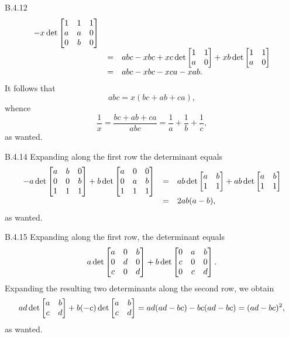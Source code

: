 \begin{Answer}{B.4.12}
$$\begin{array}{lll}
- x\det\begin{bmatrix} 1 & 1 & 1 \cr a & a & 0 \cr  0 & b & 0 \cr \end{bmatrix}\\
& = &   abc - xbc + xc\det \begin{bmatrix} 1 & 1 \cr  a & 0 \cr\end{bmatrix}  + xb\det \begin{bmatrix} 1 & 1 \cr  a & 0 \cr\end{bmatrix} \\
& = & abc - xbc - xca -xab.
     \end{array}$$It follows that $$abc = x(bc + ab + ca), $$whence$$\frac{1}{x} = \frac{bc + ab + ca}{abc} = \frac{1}{a} +\frac{1}{b} + \frac{1}{c},  $$as wanted.

\end{Answer}
\begin{Answer}{B.4.14}
 Expanding along the first row the determinant equals
$$\begin{array}{lll}-a\det\begin{bmatrix} a & b & 0 \cr
0 & 0 & b \cr 1 & 1 & 1 \cr \end{bmatrix} + b\det\begin{bmatrix} a
& 0 & 0 \cr 0 & a & b \cr 1 & 1 & 1 \cr\end{bmatrix}  & = &  ab
\det\begin{bmatrix} a & b \cr 1 & 1  \cr
\end{bmatrix} + ab\det\begin{bmatrix} a & b \cr 1 & 1  \cr
\end{bmatrix}  \\ & =  & 2ab (a - b), \end{array}$$as wanted.
\end{Answer}
\begin{Answer}{B.4.15}
 Expanding along the first row, the determinant equals
$$ a\det\begin{bmatrix} a & 0 & b \cr 0 & d & 0 \cr c & 0 & d \cr  \end{bmatrix}
+ b \det\begin{bmatrix} 0 & a & b \cr c & 0 & 0 \cr 0 & c & d \cr
\end{bmatrix}.
$$Expanding the resulting two determinants along the second row,
we obtain $$ad\det\begin{bmatrix}a & b \cr c & d\cr \end{bmatrix}
+ b(-c)\det\begin{bmatrix}a & b \cr c & d\cr  \end{bmatrix} =
ad(ad - bc) - bc(ad - bc) = (ad - bc)^2,
$$as wanted.
\end{Answer}
